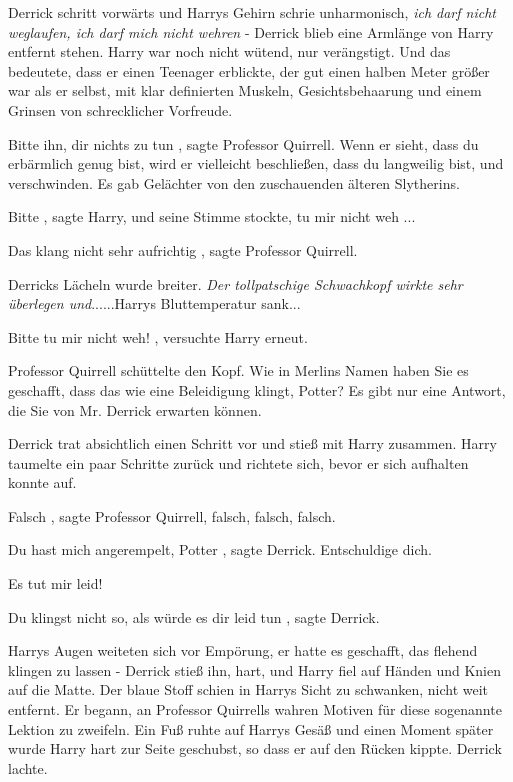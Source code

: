 Derrick schritt vorwärts und Harrys Gehirn schrie unharmonisch, \emph{ich darf
nicht weglaufen, ich darf mich nicht wehren }- Derrick blieb eine Armlänge von
Harry entfernt stehen. Harry war noch nicht wütend, nur verängstigt. Und das
bedeutete, dass er einen Teenager erblickte, der gut einen halben Meter größer
war als er selbst, mit klar definierten Muskeln, Gesichtsbehaarung und einem
Grinsen von schrecklicher Vorfreude.

\glqq Bitte ihn, dir nichts zu tun\grqq{} , sagte Professor Quirrell. \glqq Wenn
er sieht, dass du erbärmlich genug bist, wird er vielleicht beschließen, dass du
langweilig bist, und verschwinden.\grqq{} Es gab Gelächter von den zuschauenden
älteren Slytherins.

\glqq Bitte\grqq{} , sagte Harry, und seine Stimme stockte, \glqq tu mir nicht
weh ...\grqq{}

\glqq Das klang nicht sehr aufrichtig\grqq{} , sagte Professor Quirrell.

Derricks Lächeln wurde breiter. \emph{Der tollpatschige Schwachkopf wirkte sehr
überlegen und}......Harrys Bluttemperatur sank...

\glqq Bitte tu mir nicht weh!\grqq{} , versuchte Harry erneut.

Professor Quirrell schüttelte den Kopf. \glqq Wie in Merlins Namen haben Sie es
geschafft, dass das wie eine Beleidigung klingt, Potter? Es gibt nur eine
Antwort, die Sie von Mr. Derrick erwarten können.\grqq{}

Derrick trat absichtlich einen Schritt vor und stieß mit Harry zusammen. Harry
taumelte ein paar Schritte zurück und richtete sich, bevor er sich aufhalten
konnte auf.

\glqq Falsch\grqq{} , sagte Professor Quirrell, \glqq falsch, falsch,
falsch.\grqq{}

\glqq Du hast mich angerempelt, Potter\grqq{} , sagte Derrick. \glqq
Entschuldige dich.\grqq{}

\glqq Es tut mir leid!\grqq{}

\glqq Du klingst nicht so, als würde es dir leid tun\grqq{} , sagte Derrick.

Harrys Augen weiteten sich vor Empörung, er hatte es geschafft, das flehend
klingen zu lassen - Derrick stieß ihn, hart, und Harry fiel auf Händen und Knien
auf die Matte. Der blaue Stoff schien in Harrys Sicht zu schwanken, nicht weit
entfernt. Er begann, an Professor Quirrells wahren Motiven für diese sogenannte
Lektion zu zweifeln. Ein Fuß ruhte auf Harrys Gesäß und einen Moment später
wurde Harry hart zur Seite geschubst, so dass er auf den Rücken kippte. Derrick
lachte.

